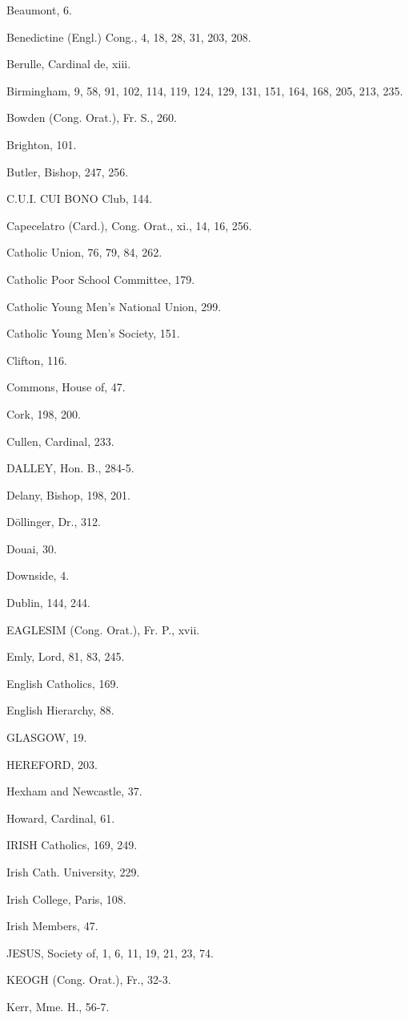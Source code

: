 Beaumont, 6.

Benedictine (Engl.) Cong., 4, 18, 28, 31, 203, 208.

Berulle, Cardinal de, xiii.

Birmingham, 9, 58, 91, 102, 114, 119, 124, 129, 131, 151, 164, 168,
205, 213, 235.

Bowden (Cong. Orat.), Fr. S., 260.

Brighton, 101.

Butler, Bishop, 247, 256.

C.U.I. CUI BONO Club,
144.

Capecelatro (Card.), Cong. Orat., xi., 14, 16, 256.

Catholic Union, 76, 79, 84, 262.

Catholic Poor School Committee, 179.

Catholic Young Men's National Union, 299.

Catholic Young Men's Society, 151.

Clifton, 116.

Commons, House of, 47.

Cork, 198, 200.

Cullen, Cardinal, 233.

DALLEY, Hon. B., 284-5.

Delany, Bishop, 198, 201.

Döllinger, Dr., 312.

Douai, 30.

Downside, 4.

Dublin, 144, 244.

EAGLESIM (Cong. Orat.), Fr. P., xvii.

Emly, Lord, 81, 83, 245.

English Catholics, 169.

English Hierarchy, 88.

GLASGOW, 19.

HEREFORD, 203.

Hexham and Newcastle, 37.

Howard, Cardinal, 61.

IRISH Catholics, 169, 249.

Irish Cath. University, 229.

Irish College, Paris, 108.

Irish Members, 47.

JESUS, Society of, 1, 6, 11, 19, 21, 23, 74.

KEOGH (Cong. Orat.), Fr., 32-3.

Kerr, Mme. H., 56-7.

